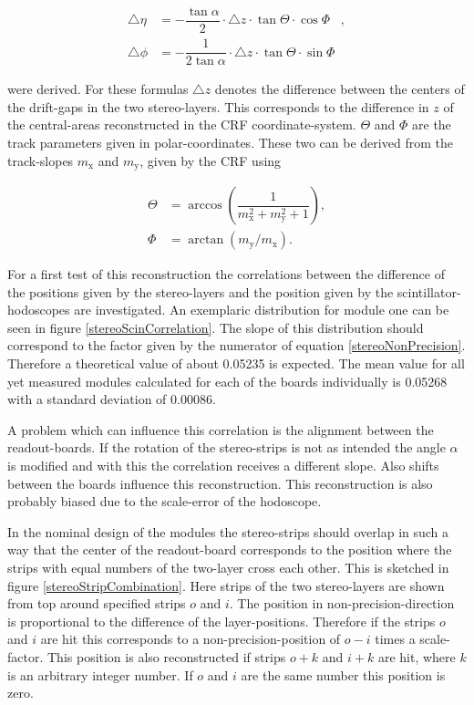 \documentclass[
twoside,            %
BCOR1.4cm,          %
10pt,               %
headings=normal,    %
headsepline,        %
clearplainpage,		%
final,              %
div=14,
open=right,
bibliography=toc
]{scrreprt}
\begin{document}
\begin{align}
	\bigtriangleup\eta &= -\dfrac{\tan\!\alpha}{2} \cdot \bigtriangleup\!z \cdot \tan\!\Theta \cdot \cos\!\Phi \;\;\; ,
	\\
	\bigtriangleup\phi &= -\dfrac{1}{2 \tan\!\alpha} \cdot \bigtriangleup\!z \cdot \tan\!\Theta \cdot \sin\!\Phi
	\label{stereoCorrections}
\end{align}

were derived.
For these formulas $\bigtriangleup\!z$ denotes the difference between the centers of the drift-gaps in the two stereo-layers.
This corresponds to the difference in $z$ of the central-areas reconstructed in the CRF coordinate-system.
$\Theta$ and $\Phi$ are the track parameters given in polar-coordinates.
These two can be derived from the track-slopes $m_{\mathrm{x}}$ and $m_{\mathrm{y}}$, given by the CRF using

\begin{align}
	\Theta &= \arccos\!\left( \dfrac{1}{ m_{\mathrm{x}}^2 + m_{\mathrm{y}}^2 + 1 } \right) ,
	\\[10pt]
	\Phi &= \arctan\!\left( m_{\mathrm{y}} /  m_{\mathrm{x}} \right) .
\end{align}

For a first test of this reconstruction the correlations between the difference of the positions given by the stereo-layers and the position given by the scintillator-hodoscopes are investigated.
An exemplaric distribution for module one can be seen in figure \ref{stereoScinCorrelation}.
The slope of this distribution should correspond to the factor given by the numerator of equation \ref{stereoNonPrecision}.
Therefore a theoretical value of about 0.05235 is expected.
The mean value for all yet measured modules calculated for each of the boards individually is 0.05268 with a standard deviation of 0.00086. 

A problem which can influence this correlation is the alignment between the readout-boards.
If the rotation of the stereo-strips is not as intended the angle $\alpha$ is modified and with this the correlation receives a different slope.
Also shifts between the boards influence this reconstruction.
This reconstruction is also probably biased due to the scale-error of the hodoscope.

In the nominal design of the modules the stereo-strips should overlap in such a way that the center of the readout-board corresponds to the position where the strips with equal numbers of the two-layer cross each other.
This is sketched in figure \ref{stereoStripCombination}.
Here strips of the two stereo-layers are shown from top around specified strips $o$ and $i$.
The position in non-precision-direction is proportional to the difference of the layer-positions.
Therefore if the strips $o$ and $i$ are hit this corresponds to a non-precision-position of $o-i$ times a scale-factor.
This position is also reconstructed if strips $o+k$ and $i+k$ are hit, where $k$ is an arbitrary integer number.
If $o$ and $i$ are the same number this position is zero.
\end{document}
